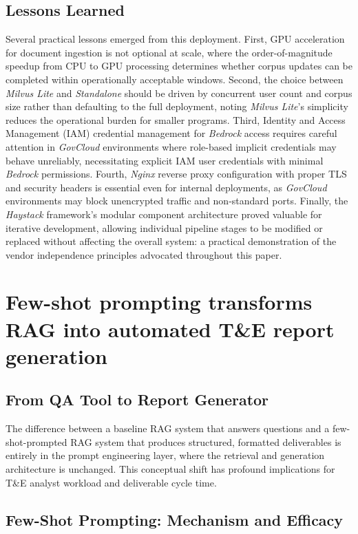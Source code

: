 \documentclass[12pt,letterpaper]{article}
\begin{document}
\subsection{Lessons Learned}

Several practical lessons emerged from this deployment. First, GPU acceleration for document ingestion is not optional at scale, where the order-of-magnitude speedup from CPU to GPU processing determines whether corpus updates can be completed within operationally acceptable windows. Second, the choice between \textit{Milvus Lite} and \textit{Standalone} should be driven by concurrent user count and corpus size rather than defaulting to the full deployment, noting \textit{Milvus Lite}'s simplicity reduces the operational burden for smaller programs. Third, Identity and Access Management (IAM) credential management for \textit{Bedrock} access requires careful attention in \textit{GovCloud} environments where role-based implicit credentials may behave unreliably, necessitating explicit IAM user credentials with minimal \textit{Bedrock} permissions. Fourth, \textit{Nginx} reverse proxy configuration with proper TLS and security headers is essential even for internal deployments, as \textit{GovCloud} environments may block unencrypted traffic and non-standard ports. Finally, the \textit{Haystack} framework's modular component architecture proved valuable for iterative development, allowing individual pipeline stages to be modified or replaced without affecting the overall system: a practical demonstration of the vendor independence principles advocated throughout this paper.

\section{Few-shot prompting transforms RAG into automated T\&E report generation}

\subsection{From QA Tool to Report Generator}

The difference between a baseline RAG system that answers questions and a few-shot-prompted RAG system that produces structured, formatted deliverables is entirely in the prompt engineering layer, where the retrieval and generation architecture is unchanged. This conceptual shift has profound implications for T\&E analyst workload and deliverable cycle time.

\subsection{Few-Shot Prompting: Mechanism and Efficacy}
\end{document}
